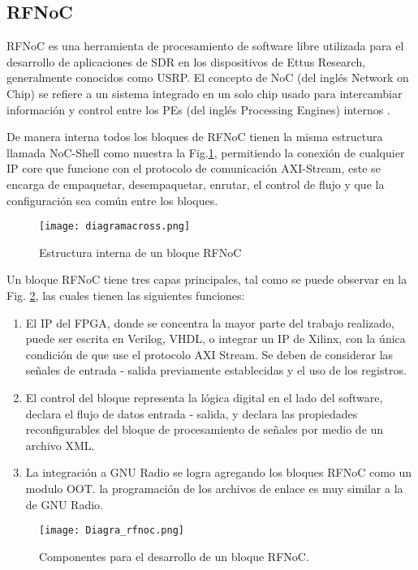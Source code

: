 \documentclass[12pt]{difu100cia} %
\begin{document}
\subsection{RFNoC}
RFNoC es una herramienta de procesamiento de software libre utilizada para el desarrollo de aplicaciones de SDR en los dispositivos de Ettus Research, generalmente conocidos como USRP. El concepto de NoC (del inglés Network on Chip) se refiere a un sistema integrado en un solo chip usado para intercambiar información y control entre los PEs (del inglés Processing Engines) internos \cite{braun2016rfnoc}.    

De manera interna todos los bloques de RFNoC tienen la misma estructura llamada NoC-Shell como muestra la Fig.\ref{diagrama_estructura_rfnoc}, permitiendo la conexión de cualquier IP core que funcione con el protocolo de comunicación AXI-Stream, este se encarga de empaquetar, desempaquetar, enrutar, el control de flujo y que la configuración sea común entre los bloques.    
\begin{figure}[!ht]
	\centering
	\texttt{[image: diagramacross.png]}
	\caption{Estructura interna de un bloque RFNoC}
	\label{diagrama_estructura_rfnoc}
\end{figure}

Un bloque RFNoC tiene tres capas principales, tal como se puede observar en  la Fig. \ref{diagrama_bloque_rfnoc}, las cuales tienen las siguientes funciones:

\begin{enumerate}
  \item El IP del FPGA, donde se concentra la mayor parte del trabajo realizado, puede ser escrita en Verilog, VHDL, o integrar un IP de Xilinx, con la única condición de que use el protocolo AXI Stream. Se deben de considerar las señales de entrada - salida previamente establecidas y el uso de los registros.  
  \item El control del bloque representa la lógica digital en el lado del software, declara el flujo de datos entrada - salida, y declara las propiedades reconfigurables del bloque de procesamiento de señales por medio de un archivo XML.  
  \item La integración a GNU Radio se logra agregando los bloques RFNoC como un modulo OOT.  la programación de los archivos de enlace es muy similar a la de GNU Radio.  
\end{enumerate}

\begin{figure}[!htb]
	\centering
	\texttt{[image: Diagra\_rfnoc.png]}
	\caption{Componentes para el desarrollo de un bloque RFNoC.}
	\label{diagrama_bloque_rfnoc}
\end{figure}
\end{document}
